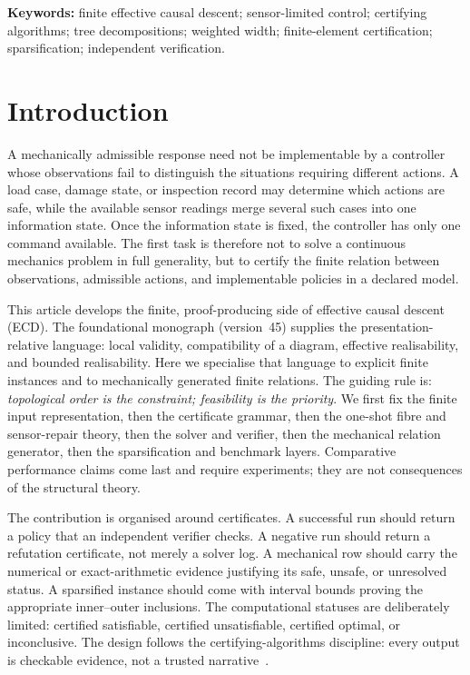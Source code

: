 \documentclass[11pt]{article}
\theoremstyle{plain}
\theoremstyle{definition}
\theoremstyle{remark}
\begin{document}
\noindent\textbf{Keywords:} finite effective causal descent; sensor-limited control;
certifying algorithms; tree decompositions; weighted width; finite-element
certification; sparsification; independent verification.

\tableofcontents

\section{Introduction}
\label{sec:introduction}

A mechanically admissible response need not be implementable by a controller
whose observations fail to distinguish the situations requiring different
actions.  A load case, damage state, or inspection record may determine which
actions are safe, while the available sensor readings merge several such cases
into one information state.  Once the information state is fixed, the controller
has only one command available.  The first task is therefore not to solve a
continuous mechanics problem in full generality, but to certify the finite
relation between observations, admissible actions, and implementable policies in
a declared model.

This article develops the finite, proof-producing side of effective causal
descent (ECD).  The foundational monograph (version~45) supplies the presentation-relative
language: local validity, compatibility of a diagram, effective realisability,
and bounded realisability.  Here we specialise that language to explicit finite
instances and to mechanically generated finite relations.  The guiding rule is:
\emph{topological order is the constraint; feasibility is the priority}.  We
first fix the finite input representation, then the certificate grammar, then
the one-shot fibre and sensor-repair theory, then the solver and verifier,
then the mechanical relation generator, then the sparsification and benchmark
layers.  Comparative performance claims come last
and require experiments; they are not consequences of the structural theory.

The contribution is organised around certificates.  A successful run should
return a policy that an independent verifier checks.  A negative run should
return a refutation certificate, not merely a solver log.  A mechanical row
should carry the numerical or exact-arithmetic evidence justifying its safe,
unsafe, or unresolved status.  A sparsified instance should come with interval
bounds proving the appropriate inner--outer inclusions.  The computational
statuses are deliberately limited: certified satisfiable, certified
unsatisfiable, certified optimal, or inconclusive.  The design follows the
certifying-algorithms discipline: every output is checkable evidence, not a
trusted narrative~\cite{mcm11}.
\end{document}
